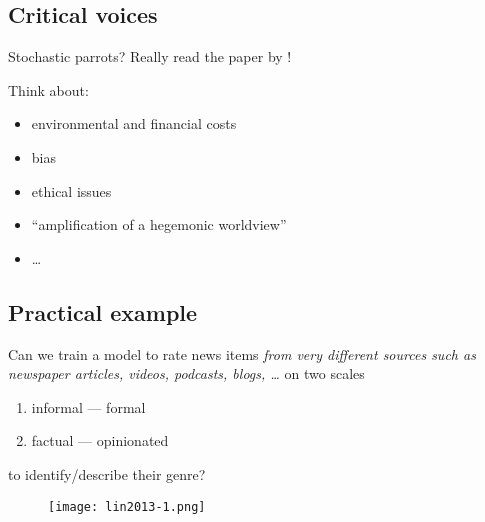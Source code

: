 



\subsection{Critical voices}


\begin{frame}{Stochastic parrots?}
Really read the paper by \parencite{Bender2021}!

Think about:

\begin{itemize}
\item environmental and financial costs
\item bias
\item ethical issues
\item ``amplification of a hegemonic worldview''
\item \ldots
\end{itemize}
  
\end{frame}








\subsection{Practical example}


\begin{frame}{\textcite{Lin2013}}

  Can we train a model to rate news items \emph{from very different sources such as newspaper articles, videos, podcasts, blogs, \ldots } on two scales
  \begin{enumerate}
  \item informal --- formal
  \item factual --- opinionated
  \end{enumerate}
to identify/describe their genre?
\end{frame}


\begin{frame}[plain]
\begin{figure}
	\centering
	\texttt{[image: lin2013-1.png]}
\end{figure}
\end{frame}


